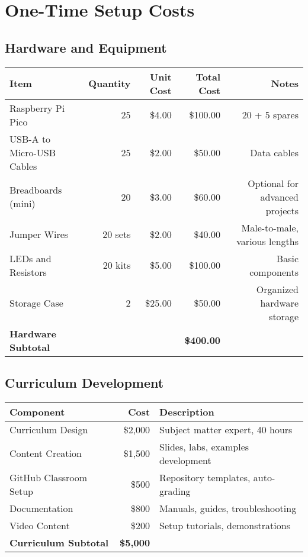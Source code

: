 \documentclass[11pt,a4paper]{article}
\begin{document}
\section{One-Time Setup Costs}

\subsection{Hardware and Equipment}

\begin{center}
\begin{tabular}{|l|r|r|r|r|}
\hline
\rowcolor{courseblue!20}
\textbf{Item} & \textbf{Quantity} & \textbf{Unit Cost} & \textbf{Total Cost} & \textbf{Notes} \\
\hline
Raspberry Pi Pico & 25 & \$4.00 & \$100.00 & 20 + 5 spares \\
\hline
USB-A to Micro-USB Cables & 25 & \$2.00 & \$50.00 & Data cables \\
\hline
Breadboards (mini) & 20 & \$3.00 & \$60.00 & Optional for advanced projects \\
\hline
Jumper Wires & 20 sets & \$2.00 & \$40.00 & Male-to-male, various lengths \\
\hline
LEDs and Resistors & 20 kits & \$5.00 & \$100.00 & Basic components \\
\hline
Storage Case & 2 & \$25.00 & \$50.00 & Organized hardware storage \\
\hline
\rowcolor{coursegreen!20}
\textbf{Hardware Subtotal} & & & \textbf{\$400.00} & \\
\hline
\end{tabular}
\end{center}

\subsection{Curriculum Development}

\begin{center}
\begin{tabular}{|l|r|l|}
\hline
\rowcolor{courseblue!20}
\textbf{Component} & \textbf{Cost} & \textbf{Description} \\
\hline
Curriculum Design & \$2,000 & Subject matter expert, 40 hours \\
\hline
Content Creation & \$1,500 & Slides, labs, examples development \\
\hline
GitHub Classroom Setup & \$500 & Repository templates, auto-grading \\
\hline
Documentation & \$800 & Manuals, guides, troubleshooting \\
\hline
Video Content & \$200 & Setup tutorials, demonstrations \\
\hline
\rowcolor{coursegreen!20}
\textbf{Curriculum Subtotal} & \textbf{\$5,000} & \\
\hline
\end{tabular}
\end{center}
\end{document}
